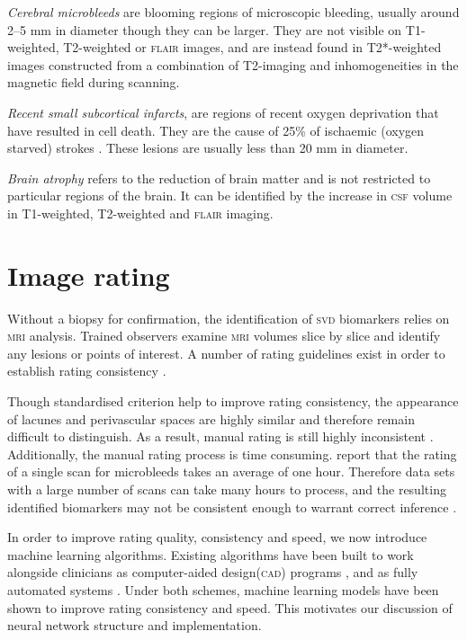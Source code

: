 \textit{Cerebral microbleeds} are blooming regions of microscopic bleeding, usually around 2--5 mm in diameter though they can be larger. They are not visible on T1-weighted, T2-weighted or \textsc{flair} images, and are instead found in T2*-weighted images constructed from a combination of T2-imaging and inhomogeneities in the magnetic field during scanning. 

\textit{Recent small subcortical infarcts}, are regions of recent oxygen deprivation that have resulted in cell death. They are the cause of 25\% of ischaemic (oxygen starved) strokes \citep{WardlawJ.M.2013Nsfr}. These lesions are usually less than 20 mm in diameter. 

\textit{Brain atrophy} refers to the reduction of brain matter and is not restricted to particular regions of the brain. It can be identified by the increase in \textsc{csf} volume in T1-weighted, T2-weighted and \textsc{flair} imaging.

\section{Image rating}\label{svd-rating}

Without a biopsy for confirmation, the identification of \textsc{svd} biomarkers relies on \textsc{mri} analysis. Trained observers examine \textsc{mri} volumes slice by slice and identify any lesions or points of interest. A number of rating guidelines exist in order to establish rating consistency \citep{AdamsH.H.Hieab2013RMfD, PotterGillian2015CPSV, WardlawJ.M.2013Nsfr}.

Though standardised criterion help to improve rating consistency, the appearance of lacunes and perivascular spaces are highly similar and therefore remain difficult to distinguish. As a result, manual rating is still highly inconsistent \citep{PotterGillian2015CPSV}. Additionally, the manual rating process is time consuming. \cite{Heuvel2016} report that the rating of a single scan for microbleeds takes an average of one hour. Therefore data sets with a large number of scans can take many hours to process, and the resulting identified biomarkers may not be consistent enough to warrant correct inference \citep{BenjaminJ.Philip2018LIbN, WardlawJ.M.2013Nsfr}.

In order to improve rating quality, consistency and speed, we now introduce machine learning algorithms. Existing algorithms have been built to work alongside clinicians as computer-aided design(\textsc{cad}) programs \citep{Heuvel2016, Uchiyama20071554, Yokoyama2007}, and as fully automated systems \citep{DouQ.2016ADoC, GhafoorianM.2017Dml3}. Under both schemes, machine learning models have been shown to improve rating consistency and speed. This motivates our discussion of neural network structure and implementation.



